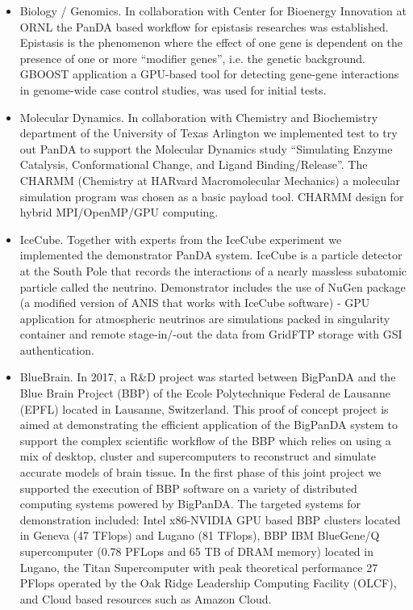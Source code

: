 \begin{itemize}
    \item Biology / Genomics. 
In collaboration with Center for Bioenergy Innovation at ORNL the PanDA based
workflow for epistasis researches was established. Epistasis is the phenomenon
where the effect of one gene is dependent on the presence of one or more
        ``modifier genes'', i.e. the genetic background. GBOOST application \cite{GBOOST} a
GPU-based tool for detecting gene-gene interactions in genome-wide case control
studies, was used for initial tests.

    \item Molecular Dynamics.
In collaboration with Chemistry and Biochemistry department of the University
of Texas Arlington we implemented test to try out PanDA to support the
Molecular Dynamics study ``Simulating Enzyme Catalysis, Conformational Change,
and Ligand Binding/Release''. The CHARMM (Chemistry at HARvard Macromolecular
        Mechanics) \cite{Brooks2009CHARMM} a molecular simulation program was chosen as a basic
payload tool. CHARMM design for hybrid MPI/OpenMP/GPU computing.

    \item IceCube. 
Together with  experts from the IceCube experiment we implemented the
        demonstrator PanDA system. IceCube \cite{Halzen:2010yj} is a particle detector at the
South Pole that records the interactions of a nearly massless subatomic
particle called the neutrino. Demonstrator includes the use of NuGen package (a
        modified version of ANIS \cite{Gazizov:2004va} that works with IceCube software) - GPU
application for atmospheric neutrinos are simulations packed in singularity
        container and remote stage-in/-out the data from GridFTP \cite{Allcock:2005:GSG:1105760.1105819} storage with
GSI authentication. 

    \item BlueBrain.
In 2017, a R\&D project was started between BigPanDA and the Blue Brain Project
        (BBP) \cite{Markram} of the Ecole Polytechnique Federal de Lausanne (EPFL) located in
Lausanne, Switzerland. This proof of concept project is aimed at demonstrating
the efficient application of the BigPanDA system to support the complex
scientific workflow of the BBP which relies on using a mix of desktop, cluster
and supercomputers to reconstruct and simulate accurate models of brain tissue.
In the first phase of this joint project we supported the execution of BBP
software on a variety of distributed computing systems powered by BigPanDA. The
targeted systems for demonstration included: Intel x86-NVIDIA GPU based BBP
clusters located in Geneva (47 TFlops) and Lugano (81 TFlops), BBP IBM
        BlueGene/Q supercomputer \cite{citeulike:472727} (0.78 PFLops and 65 TB of DRAM memory)
located in Lugano, the Titan Supercomputer with peak theoretical performance 27
PFlops operated by the Oak Ridge Leadership Computing Facility (OLCF), and
Cloud based resources such as Amazon Cloud.


\end{itemize}
